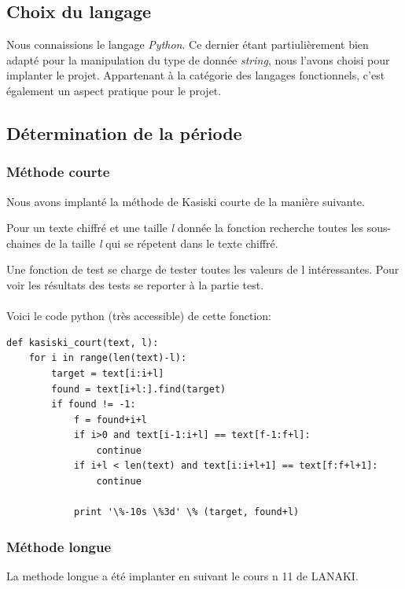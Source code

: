 \documentclass[a4paper, 11pt]{article}
\begin{document}
\subsection{Choix du langage}
Nous connaissions le langage \textit{Python}.
Ce dernier étant partiulièrement bien adapté pour la manipulation
du type de donnée \textit{string}, nous l'avons choisi pour implanter
le projet.
Appartenant à la catégorie des langages fonctionnels, c'est également
un aspect pratique pour le projet.

\subsection{Détermination de la période}

\subsubsection{Méthode courte}
Nous avons implanté la méthode de Kasiski courte de la manière
suivante.

Pour un texte chiffré et une taille \textit{l} donnée la fonction recherche toutes
les sous-chaines de la taille \textit{l} qui se répetent dans le texte
chiffré.

Une fonction de test se charge de tester toutes les valeurs de l
intéressantes.
Pour voir les résultats des tests se reporter à la partie test.

\paragraph{}
Voici le code python (très accessible) de cette fonction:
\newpage
\begin{lstlisting}
def kasiski_court(text, l):
    for i in range(len(text)-l):
        target = text[i:i+l]
        found = text[i+l:].find(target)
        if found != -1:
            f = found+i+l
            if i>0 and text[i-1:i+l] == text[f-1:f+l]:
                continue
            if i+l < len(text) and text[i:i+l+1] == text[f:f+l+1]:
                continue            

            print '\%-10s \%3d' \% (target, found+l)
\end{lstlisting}


\subsubsection{Méthode longue}
La methode longue a été implanter en suivant le cours n 11 de LANAKI.
\end{document}
